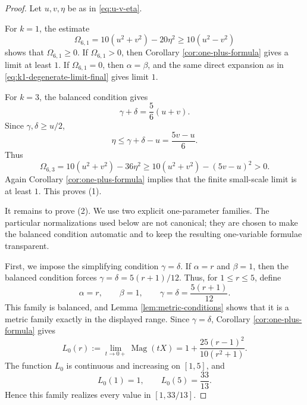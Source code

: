 \documentclass[11pt]{amsart}
\numberwithin{equation}{section}
\theoremstyle{definition}
\theoremstyle{remark}
\DeclareMathOperator{\Mag}{Mag}
\begin{document}
\begin{proof}
Let \(u,v,\eta\) be as in \eqref{eq:u-v-eta}.

For \(k=1\), the estimate
\begin{equation}\label{eq:n6k1-Omega}
\Omega_{6,1}=10(u^2+v^2)-20\eta^2
\geq 10(u^2-v^2)
\end{equation}
shows that \(\Omega_{6,1}\geq 0\).  If \(\Omega_{6,1}>0\), then Corollary \ref{cor:one-plus-formula} gives a limit at least \(1\).  If \(\Omega_{6,1}=0\), then \(\alpha=\beta\), and the same direct expansion as in \eqref{eq:k1-degenerate-limit-final} gives limit \(1\).

For \(k=3\), the balanced condition gives
\begin{equation}\label{eq:n6k3-balanced}
\gamma+\delta=\frac{5}{6}(u+v).
\end{equation}
Since \(\gamma,\delta\geq u/2\),
\begin{equation}\label{eq:n6k3-eta-bound}
\eta\leq \gamma+\delta-u=\frac{5v-u}{6}.
\end{equation}
Thus
\begin{equation}\label{eq:n6k3-Omega-positive}
\Omega_{6,3}
=10(u^2+v^2)-36\eta^2
\geq 10(u^2+v^2)-(5v-u)^2>0.
\end{equation}
Again Corollary \ref{cor:one-plus-formula} implies that the finite small-scale limit is at least \(1\).  This proves \textup{(1)}.

It remains to prove \textup{(2)}.  We use two explicit one-parameter families.
The particular normalizations used below are not canonical; they are chosen to
make the balanced condition automatic and to keep the resulting one-variable
formulae transparent.

First, we impose the simplifying condition \(\gamma=\delta\).  If
\(\alpha=r\) and \(\beta=1\), then the balanced condition forces
\(\gamma=\delta=5(r+1)/12\).  Thus, for \(1\leq r\leq 5\), define
\begin{equation}\label{eq:n6-family-zero}
\alpha=r,
\qquad
\beta=1,
\qquad
\gamma=\delta=\frac{5(r+1)}{12}.
\end{equation}
This family is balanced, and Lemma \ref{lem:metric-conditions} shows that it is a metric family exactly in the displayed range.  Since \(\gamma=\delta\), Corollary \ref{cor:one-plus-formula} gives
\begin{equation}\label{eq:n6-L-zero}
L_0(r)
:=\lim_{t\to 0+}\Mag(tX)
=1+\frac{25(r-1)^2}{10(r^2+1)}.
\end{equation}
The function \(L_0\) is continuous and increasing on \([1,5]\), and
\begin{equation}\label{eq:n6-L-zero-endpoints}
L_0(1)=1,
\qquad
L_0(5)=\frac{33}{13}.
\end{equation}
Hence this family realizes every value in \([1,33/13]\).


\end{proof}
\end{document}
